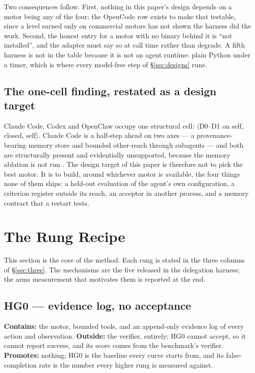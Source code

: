 Two consequences follow. First, nothing in this paper's design depends on a motor being any of the four; the OpenCode row exists to make that testable, since a level earned only on commercial motors has not shown the harness did the work. Second, the honest entry for a motor with no binary behind it is ``not installed'', and the adapter must say so at call time rather than degrade. A fifth harness is not in the table because it is not an agent runtime: plain Python under a timer, which is where every model-free step of \S\ref{sec:designs} runs.

\subsection{The one-cell finding, restated as a design target}

Claude Code, Codex and OpenClaw occupy one structural cell: $\langle$D0--D1 on self, closed, self$\rangle$. Claude Code is a half-step ahead on two axes --- a provenance-bearing memory store and bounded other-reach through subagents --- and both are structurally present and evidentially unsupported, because the memory ablation is not run \citep{yang2026capability}. The design target of this paper is therefore not to pick the best motor. It is to build, around whichever motor is available, the four things none of them ships: a held-out evaluation of the agent's own configuration, a criterion register outside its reach, an acceptor in another process, and a memory contract that a restart tests.

\section{The Rung Recipe}\label{sec:recipe}

This section is the core of the method. Each rung is stated in the three columns of \S\ref{sec:three}. The mechanisms are the five released in the delegation harness; the arms measurement that motivates them is reported at the end.

\subsection{HG0 --- evidence log, no acceptance}

\textbf{Contains:} the motor, bounded tools, and an append-only evidence log of every action and observation. \textbf{Outside:} the verifier, entirely; HG0 cannot accept, so it cannot report success, and its score comes from the benchmark's verifier. \textbf{Promotes:} nothing; HG0 is the baseline every curve starts from, and its false-completion rate is the number every higher rung is measured against.

